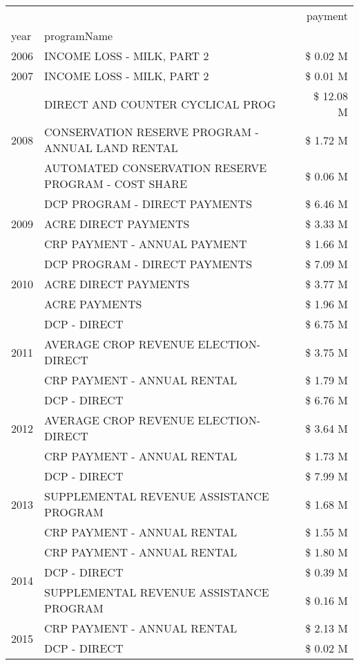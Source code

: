 \begin{tabular}{llr}
\toprule
 &  & payment \\
year & programName &  \\
\midrule
2006 & INCOME LOSS - MILK, PART 2 & \$ 0.02 M \\
\cline{1-3}
2007 & INCOME LOSS - MILK, PART 2 & \$ 0.01 M \\
\cline{1-3}
\multirow[t]{3}{*}{2008} & DIRECT AND COUNTER CYCLICAL PROG & \$ 12.08 M \\
 & CONSERVATION RESERVE PROGRAM - ANNUAL LAND RENTAL & \$ 1.72 M \\
 & AUTOMATED CONSERVATION RESERVE PROGRAM - COST SHARE & \$ 0.06 M \\
\cline{1-3}
\multirow[t]{3}{*}{2009} & DCP PROGRAM - DIRECT PAYMENTS & \$ 6.46 M \\
 & ACRE DIRECT PAYMENTS & \$ 3.33 M \\
 & CRP PAYMENT - ANNUAL PAYMENT & \$ 1.66 M \\
\cline{1-3}
\multirow[t]{3}{*}{2010} & DCP PROGRAM - DIRECT PAYMENTS & \$ 7.09 M \\
 & ACRE DIRECT PAYMENTS & \$ 3.77 M \\
 & ACRE PAYMENTS & \$ 1.96 M \\
\cline{1-3}
\multirow[t]{3}{*}{2011} & DCP - DIRECT & \$ 6.75 M \\
 & AVERAGE CROP REVENUE ELECTION-DIRECT & \$ 3.75 M \\
 & CRP PAYMENT - ANNUAL RENTAL & \$ 1.79 M \\
\cline{1-3}
\multirow[t]{3}{*}{2012} & DCP - DIRECT & \$ 6.76 M \\
 & AVERAGE CROP REVENUE ELECTION-DIRECT & \$ 3.64 M \\
 & CRP PAYMENT - ANNUAL RENTAL & \$ 1.73 M \\
\cline{1-3}
\multirow[t]{3}{*}{2013} & DCP - DIRECT & \$ 7.99 M \\
 & SUPPLEMENTAL REVENUE ASSISTANCE PROGRAM & \$ 1.68 M \\
 & CRP PAYMENT - ANNUAL RENTAL & \$ 1.55 M \\
\cline{1-3}
\multirow[t]{3}{*}{2014} & CRP PAYMENT - ANNUAL RENTAL & \$ 1.80 M \\
 & DCP - DIRECT & \$ 0.39 M \\
 & SUPPLEMENTAL REVENUE ASSISTANCE PROGRAM & \$ 0.16 M \\
\cline{1-3}
\multirow[t]{3}{*}{2015} & CRP PAYMENT - ANNUAL RENTAL & \$ 2.13 M \\
 & DCP - DIRECT & \$ 0.02 M \\

\end{tabular}
